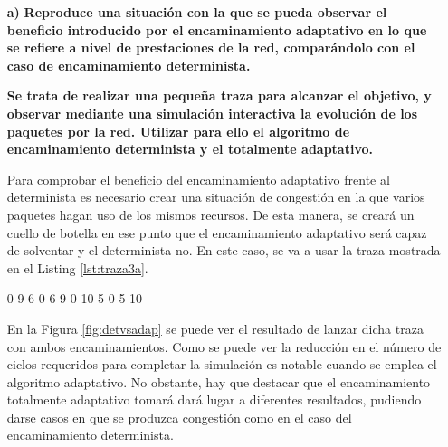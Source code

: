 \begin{itemize}
    \item [\textbf{a)}] \textbf{Reproduce una situación con la que se pueda observar el beneficio introducido por el encaminamiento adaptativo en lo que se refiere a nivel de  prestaciones de la red, comparándolo con el caso de encaminamiento determinista.}

    \textbf{Se trata de realizar una pequeña traza para alcanzar el objetivo, y observar mediante una simulación interactiva la evolución de los paquetes por la red.  Utilizar para ello el algoritmo de encaminamiento determinista y el totalmente adaptativo.}

    Para comprobar el beneficio del encaminamiento adaptativo frente al determinista es necesario crear una situación de congestión en la que varios paquetes hagan uso de los mismos recursos. De esta manera, se creará un cuello de botella en ese punto que el encaminamiento adaptativo será capaz de solventar y el determinista no. En este caso, se va a usar la traza mostrada en el Listing \ref{lst:traza3a}.

    \begin{mycode}[style=mycodestyle, caption={Traza para provocar congestión.}, label=lst:traza3a]
0 9 6
0 6 9
0 10 5
0 5 10
    \end{mycode}
    
    En la Figura \ref{fig:detvsadap} se puede ver el resultado de lanzar dicha traza con ambos encaminamientos. Como se puede ver la reducción en el número de ciclos requeridos para completar la simulación es notable cuando se emplea el algoritmo adaptativo. No obstante, hay que destacar que el encaminamiento totalmente adaptativo tomará dará lugar a diferentes resultados, pudiendo darse casos en que se produzca congestión como en el caso del encaminamiento determinista.


\end{itemize}
